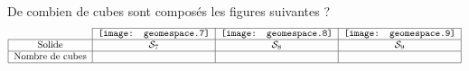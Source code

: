 De combien de cubes sont composés les figures suivantes ?
\[\begin{tabular}{|c|c|c|c|}
\cline{2-4}
\multicolumn{1}{c|}{}&\texttt{[image: geomespace.7]}&\texttt{[image: geomespace.8]}&\texttt{[image: geomespace.9]}\\
\hline
Solide&${\cal S}_7$&${\cal S}_8$&${\cal S}_9$\\
\hline
Nombre de cubes&&&\\
\hline
\end{tabular}
\]
